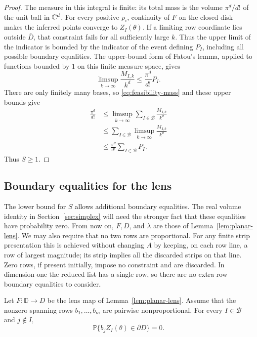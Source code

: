 \begin{proof}
The measure in this integral is finite: its total mass is the volume
$\pi^d/d!$ of the unit ball in $\mathbb C^d$. For every positive $\rho_i$,
continuity of $F$ on the closed disk makes the inferred points converge
to $Z_I(\theta)$. If a limiting row coordinate lies outside
$\overline D$, that constraint fails for all sufficiently large $k$.
Thus the upper limit of the indicator is bounded by the indicator of
the event defining $P_I$, including all possible boundary equalities.
The upper-bound form of Fatou's lemma, applied to functions bounded by
$1$ on this finite measure space, gives
\[
 \limsup_{k\to\infty}\frac{M_{I,k}}{k^d}
 \leq \frac{\pi^d}{d!}P_I.
\]
There are only finitely many bases, so \eqref{eq:feasibility-mass}
and these upper bounds give
\begin{align*}
 \frac{\pi^d}{d!}
 &\leq\limsup_{k\to\infty}
          \sum_{I\in\mathcal B}\frac{M_{I,k}}{k^d}\\
 &\leq\sum_{I\in\mathcal B}
          \limsup_{k\to\infty}\frac{M_{I,k}}{k^d}\\
 &\leq\frac{\pi^d}{d!}\sum_{I\in\mathcal B}P_I.
\end{align*}
Thus $S\geq1$.
\end{proof}

\subsection{Boundary equalities for the lens}

The lower bound for $S$ allows additional boundary equalities. The real
volume identity in Section~\ref{sec:simplex} will need the stronger fact
that these equalities have probability zero.
From now on, $F,D$, and $\lambda$ are those of
Lemma~\ref{lem:planar-lens}. We may also require that no two rows are
proportional. For any finite strip presentation this is achieved without
changing $A$ by keeping, on each row line, a row of largest magnitude;
its strip implies all the discarded strips on that line. Zero rows, if
present initially, impose no constraint and are discarded.
In dimension one the reduced list has a single row, so there are no
extra-row boundary equalities to consider.

\begin{lemma}
\label{lem:boundary-ties}
Let $F:\mathbb D\to D$ be the lens map of Lemma~\ref{lem:planar-lens}.
Assume that the nonzero spanning rows $b_1,\ldots,b_m$ are pairwise
nonproportional. For every $I\in\mathcal B$ and $j\notin I$,
\[
 \mathbb P\{b_jZ_I(\theta)\in\partial D\}=0.
\]
\end{lemma}

